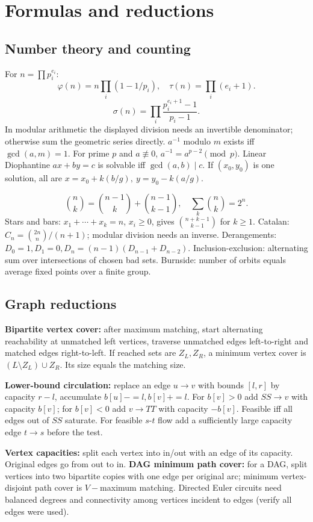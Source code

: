 \section{Formulas and reductions}
\subsection{Number theory and counting}
For $n=\prod p_i^{e_i}$:
\[
\varphi(n)=n\prod_i(1-1/p_i),\quad
\tau(n)=\prod_i(e_i+1).
\]
\[
\sigma(n)=\prod_i\frac{p_i^{e_i+1}-1}{p_i-1}.
\]
In modular arithmetic the displayed division needs an invertible denominator;
otherwise sum the geometric series directly.
$a^{-1}$ modulo $m$ exists iff $\gcd(a,m)=1$.
For prime $p$ and $a\not\equiv0$, $a^{-1}=a^{p-2}\pmod p$.
Linear Diophantine $ax+by=c$ is solvable iff $\gcd(a,b)\mid c$.
If $(x_0,y_0)$ is one solution, all are
$x=x_0+k(b/g),\ y=y_0-k(a/g)$.

\[
\binom nk=\binom{n-1}k+\binom{n-1}{k-1},\quad
\sum_k\binom nk=2^n.
\]
Stars and bars: $x_1+\cdots+x_k=n$, $x_i\ge0$, gives
$\binom{n+k-1}{k-1}$ for $k\ge1$.
Catalan: $C_n=\binom{2n}n/(n+1)$; modular division needs an inverse.
Derangements: $D_0=1,D_1=0,D_n=(n-1)(D_{n-1}+D_{n-2})$.
Inclusion-exclusion: alternating sum over intersections of chosen bad sets.
Burnside: number of orbits equals average fixed points over a finite group.

\subsection{Graph reductions}
\textbf{Bipartite vertex cover:} after maximum matching, start alternating
reachability at unmatched left vertices, traverse unmatched edges left-to-right
and matched edges right-to-left. If reached sets are $Z_L,Z_R$, a minimum
vertex cover is $(L\setminus Z_L)\cup Z_R$. Its size equals the matching size.

\textbf{Lower-bound circulation:} replace an edge $u\to v$ with bounds $[l,r]$
by capacity $r-l$, accumulate $b[u]-=l,b[v]+=l$. For $b[v]>0$ add
$SS\to v$ with capacity $b[v]$; for $b[v]<0$ add $v\to TT$ with capacity
$-b[v]$. Feasible iff all edges out of $SS$ saturate. For feasible $s$-$t$
flow add a sufficiently large capacity edge $t\to s$ before the test.

\textbf{Vertex capacities:} split each vertex into in/out with an edge of its
capacity. Original edges go from out to in.
\textbf{DAG minimum path cover:} for a DAG, split vertices into two bipartite
copies with one edge per original arc; minimum vertex-disjoint path cover is
$V-$maximum matching. Directed Euler circuits need balanced degrees and
connectivity among vertices incident to edges (verify all edges were used).


